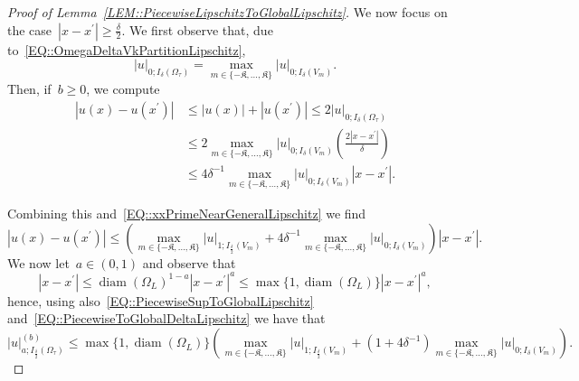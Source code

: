 \documentclass[10pt,a4paper]{amsart}
\newcommand{\abs}[1]{\left\lvert#1\right\rvert}
\renewcommand{\geq}{\geqslant}
\renewcommand{\leq}{\leqslant}
\begin{document}
\begin{proof}[Proof of Lemma~\ref{LEM::PiecewiseLipschitzToGlobalLipschitz}]
    We now focus on the case~$\abs{x-x^\prime} \geq \frac{\delta}{2}$. We first observe that, due to~\eqref{EQ::OmegaDeltaVkPartitionLipschitz},
    \begin{equation}\label{EQ::PiecewiseSupToGlobalLipschitz}
        \abs{u}_{0;I_\delta(\Omega_\tau)} = \max_{m \in \{-\mathfrak{K},\dots,\mathfrak{K}\}}\abs{u}_{0;I_\delta(V_m)}.
    \end{equation}
    Then, if~$b \geq 0$, we compute
    \begin{align}\label{OLD::EQ::xxprimeFarPositiveB}
        \abs{u(x)-u(x^\prime)} &\leq \abs{u(x)}+\abs{u(x^\prime)} \leq 2\abs{u}_{0;I_\delta(\Omega_\tau)}\\
            &\leq 2\max_{m \in \{-\mathfrak{K},\dots,\mathfrak{K}\}}\abs{u}_{0;I_\delta(V_m)}{\left(\frac{2\abs{x-x^\prime}}{\delta}\right)}\\
            &\leq 4{\delta^{-1}}\max_{m \in \{-\mathfrak{K},\dots,\mathfrak{K}\}}\abs{u}_{0;I_\delta(V_m)}\abs{x-x^\prime}.
    \end{align}

    Combining this and~\eqref{EQ::xxPrimeNearGeneralLipschitz} we find
    \begin{equation}\label{EQ::PiecewiseToGlobalDeltaLipschitz}
        \abs{u(x)-u(x^\prime)} \leq \left(\max_{m \in \{-\mathfrak{K},\dots,\mathfrak{K}\}} \abs{u}_{1; I_{\frac{\delta}{2}}(V_m)} + 4{\delta^{-1}}\max_{m \in \{-\mathfrak{K},\dots,\mathfrak{K}\}}\abs{u}_{0;I_\delta(V_m)}\right) \abs{x-x^\prime}.
    \end{equation}
    We now let~$a \in (0,1)$ and observe that
    \begin{equation}\label{EQ::LipschitzToHolderDistance}
        \abs{x-x^\prime} \leq {\operatorname{diam}(\Omega_L)}^{1-a} \abs{x-x^\prime}^a \leq \max\{1,\operatorname{diam}(\Omega_L)\} \abs{x-x^\prime}^a,
    \end{equation}
    hence, using also~\eqref{EQ::PiecewiseSupToGlobalLipschitz} and~\eqref{EQ::PiecewiseToGlobalDeltaLipschitz} we have that
    \begin{equation}
        \abs{u}_{a; I_{\frac{\delta}{2}}(\Omega_\tau)}^{(b)} \leq \max\{1,\operatorname{diam}(\Omega_L)\} \left(\max_{m \in \{-\mathfrak{K},\dots,\mathfrak{K}\}} \abs{u}_{1; I_{\frac{\delta}{2}}(V_m)} + (1+4{\delta^{-1}})\max_{m \in \{-\mathfrak{K},\dots,\mathfrak{K}\}}\abs{u}_{0;I_\delta(V_m)}\right).
    \end{equation}


\end{proof}
\end{document}
